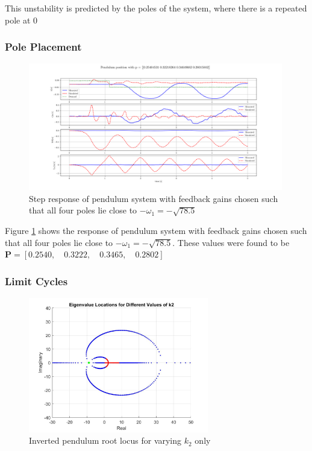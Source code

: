 \documentclass{article}
\begin{document}
This unstability is predicted by the poles of the system, where there is a repeated pole at 0


\subsubsection{Pole Placement}
\begin{figure}[H]
  \centering
  \includegraphics[width=0.99\textwidth]{figures/4.3.png}
  \caption{Step response of pendulum system with feedback gains chosen such that all four poles lie close to $-\omega_1 = -\sqrt{78.5}$}
  \label{fig:4.3}
\end{figure}

Figure \ref{fig:4.3} shows the response of pendulum system with feedback gains chosen such that all four poles lie close to $-\omega_1 = -\sqrt{78.5}$.
These values were found to be $\mathbf{P} = [0.2540, \quad 0.3222, \quad 0.3465, \quad 0.2802]$

\subsubsection{Limit Cycles}

\begin{figure}[H]
  \centering
  \includegraphics[width=0.7\textwidth]{figures/4.4roots.jpg}
  \caption{Inverted pendulum root locus for varying $k_2$ only}
  \label{fig:roots4.4}
\end{figure}
\end{document}
